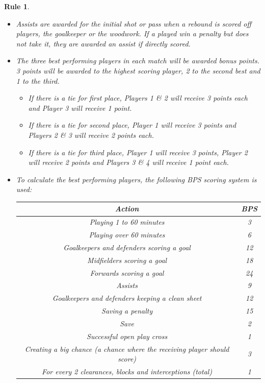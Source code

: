 \documentclass[12pt, a4paper, oneside]{book}
\newtheorem{rules}[theorem]{Rule}
\numberwithin{equation}{section}
\begin{document}
\begin{rules}
\begin{itemize}
    \item Assists are awarded for the initial shot or pass when a rebound is scored off players, the goalkeeper or the woodwork. If a played win a penalty but does not take it, they are awarded an assist if directly scored.
    \item The three best performing players in each match will be awarded bonus points. 3 points will be awarded to the highest scoring player, 2 to the second best and 1 to the third.
    \begin{itemize}
      \item If there is a tie for first place, Players 1 \& 2 will receive 3 points each and Player 3 will receive 1 point.
      \item If there is a tie for second place, Player 1 will receive 3 points and Players 2 \& 3 will receive 2 points each.
      \item If there is a tie for third place, Player 1 will receive 3 points, Player 2 will receive 2 points and Players 3 \& 4 will receive 1 point each.
    \end{itemize}
    \item To calculate the best performing players, the following BPS scoring system is used:
    \begin{center}
      \begin{tabular}{ |c|c| }
        \hline
        Action & BPS \\ [0.5ex] 
        \hline\hline
        Playing 1 to 60 minutes & 3 \\
        \hline
        Playing over 60 minutes & 6 \\
        \hline
        Goalkeepers and defenders scoring a goal & 12 \\
        \hline
        Midfielders scoring a goal & 18 \\
        \hline
        Forwards scoring a goal & 24 \\
        \hline
        Assists & 9 \\
        \hline
        Goalkeepers and defenders keeping a clean sheet & 12 \\
        \hline
        Saving a penalty & 15 \\
        \hline
        Save & 2 \\
        \hline
        Successful open play cross & 1 \\
        \hline
        Creating a big chance (a chance where the receiving player should score) & 3 \\
        \hline
        For every 2 clearances, blocks and interceptions (total) & 1 \\

\end{tabular}
\end{center}
\end{itemize}
\end{rules}
\end{document}
